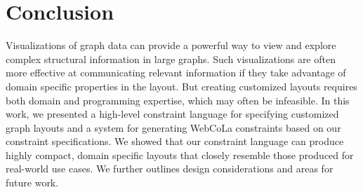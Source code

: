 \section{Conclusion}
Visualizations of graph data can provide a powerful way to view and explore complex structural information in large graphs. Such visualizations are often more effective at communicating relevant information if they take advantage of domain specific properties in the layout. But creating customized layouts requires both domain and programming expertise, which may often be infeasible. In this work, we presented a high-level constraint language for specifying customized graph layouts and a system for generating \mbox{WebCoLa} constraints based on our constraint specifications. We showed that our constraint language can produce highly compact, domain specific layouts that closely resemble those produced for real-world use cases. We further outlines design considerations and areas for future work.
